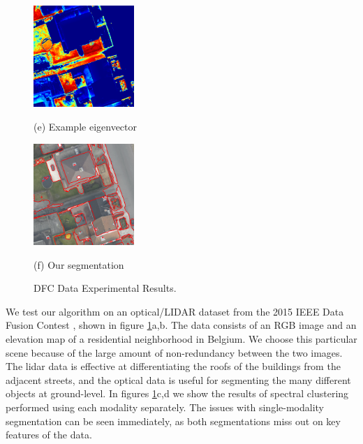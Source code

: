 \documentclass{article}
\begin{document}
\begin{figure}[htb]
  \begin{minipage}[b]{.48\linewidth}
    \label{fig:evec}
    \centering
    \centerline{\includegraphics[width=3.8cm]{./Images/DFC2015/evecColor.png}}
    \centerline{(e) Example eigenvector}\medskip
  \end{minipage}
%
  \begin{minipage}[b]{.48\linewidth}
    \centering
    \centerline{\includegraphics[width=3.8cm]{./Images/DFC2015/withBorders.png}}
    \centerline{(f) Our segmentation}\medskip
  \end{minipage}
  \caption{DFC Data Experimental Results.}
  \label{fig:experimentDFC}
\end{figure}

We test our algorithm on an optical/LIDAR dataset from the 2015 IEEE Data Fusion
Contest \cite{7536139}, shown in figure \ref{fig:experimentDFC}a,b. The data
consists of an RGB image and an elevation map of a residential neighborhood in
Belgium. We choose this particular scene because of the large amount of
non-redundancy between the two images. The lidar data is effective at
differentiating the roofs of the buildings from the adjacent streets, and the
optical data is useful for segmenting the many different objects at
ground-level. In figures \ref{fig:experimentDFC}c,d we show the results of
spectral clustering performed using each modality separately. The issues with
single-modality segmentation can be seen immediately, as both segmentations miss
out on key features of the data.
\end{document}
